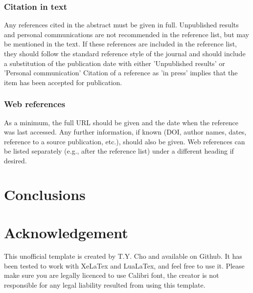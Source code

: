 \documentclass[11pt,a4paper,twoside,twocolumn]{article}
\begin{document}
\subsubsection{Citation in text}
Any references cited in the abstract must be given in full. Unpublished results and personal communications are not recommended in the reference list, but may be mentioned in the text. If these references are included in the reference list, they should follow the standard reference style of the journal and should include a substitution of the publication date with either 'Unpublished results' or 'Personal communication' Citation of a reference as 'in press' implies that the item has been accepted for publication.

\subsubsection{Web references}
As a minimum, the full URL should be given and the date when the reference was last accessed. Any further information, if known (DOI, author names, dates, reference to a source publication, etc.), should also be given. Web references can be listed separately (e.g., after the reference list) under a different heading if desired. 

\section{Conclusions}

\section*{Acknowledgement}
This unofficial template is created by T.Y. Cho and available on Github. It has been tested to work with XeLaTex and LuaLaTex, and feel free to use it. Please make sure you are legally licenced to use Calibri font, the creator is not responsible for any legal liability resulted from using this template.

\printbibliography
\end{document}
